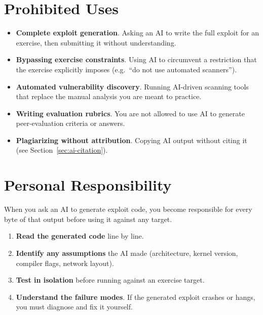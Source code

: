 \section{Prohibited Uses}

\begin{itemize}
  \item \textbf{Complete exploit generation}. Asking an AI to write
        the full exploit for an exercise, then submitting it without
        understanding.
  \item \textbf{Bypassing exercise constraints}. Using AI to circumvent
        a restriction that the exercise explicitly imposes (e.g.\
        ``do not use automated scanners'').
  \item \textbf{Automated vulnerability discovery}. Running AI-driven
        scanning tools that replace the manual analysis you are meant
        to practice.
  \item \textbf{Writing evaluation rubrics}. You are not allowed to
        use AI to generate peer-evaluation criteria or answers.
  \item \textbf{Plagiarizing without attribution}. Copying AI output
        without citing it (see Section~\ref{sec:ai-citation}).
\end{itemize}

\section{Personal Responsibility}

When you ask an AI to generate exploit code, you become responsible
for every byte of that output before using it against any target.

\begin{enumerate}
  \item \textbf{Read the generated code} line by line.
  \item \textbf{Identify any assumptions} the AI made (architecture,
        kernel version, compiler flags, network layout).
  \item \textbf{Test in isolation} before running against an exercise
        target.
  \item \textbf{Understand the failure modes}. If the generated exploit
        crashes or hangs, you must diagnose and fix it yourself.
\end{enumerate}


